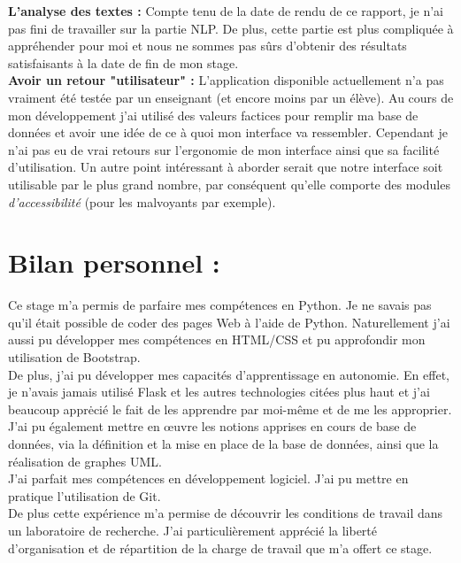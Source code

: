 \documentclass[12pt]{article}
\begin{document}
\textbf{L'analyse des textes :}  Compte tenu de la date de rendu de ce rapport, je n'ai pas fini de travailler sur la partie NLP. De plus, cette partie est plus compliquée à appréhender pour moi et nous ne sommes pas sûrs d'obtenir des résultats satisfaisants à la date de fin de mon stage. \\

\textbf{Avoir un retour "utilisateur" :} L'application disponible actuellement n'a pas vraiment été testée par un enseignant (et encore moins par un élève). Au cours de mon développement j'ai utilisé des valeurs factices pour remplir ma base de données et avoir une idée de ce à quoi mon interface va ressembler. Cependant je n'ai pas eu de vrai retours sur l'ergonomie de mon interface ainsi que sa facilité d'utilisation. 
Un autre point intéressant à aborder serait que notre interface soit utilisable par le plus grand nombre, par conséquent qu'elle comporte des modules \textit{d'accessibilité} (pour les malvoyants par exemple). 


\section{Bilan personnel :}


Ce stage m’a permis de parfaire mes compétences en Python. Je ne savais pas qu’il était possible de coder des pages Web à l’aide de Python. Naturellement j’ai aussi pu développer mes compétences en HTML/CSS et pu approfondir mon utilisation de Bootstrap. \\
De plus, j'ai pu développer mes capacités d'apprentissage en autonomie. En effet, je n'avais jamais utilisé Flask et les autres technologies citées plus haut et j'ai beaucoup apprėcié le fait de les apprendre par moi-même et de me les approprier. \\
J’ai pu également mettre en œuvre les notions apprises en cours de base de données, via la définition et la mise en place de la base de données, ainsi que la réalisation de graphes UML. \\
J'ai parfait mes compétences en développement logiciel. J'ai pu mettre en pratique l'utilisation de Git. \\

De plus cette expérience m’a permise de découvrir les conditions de travail dans un laboratoire de recherche. J’ai particulièrement apprécié la liberté d’organisation et de répartition de la charge de travail que m’a offert ce stage. \\
\end{document}
